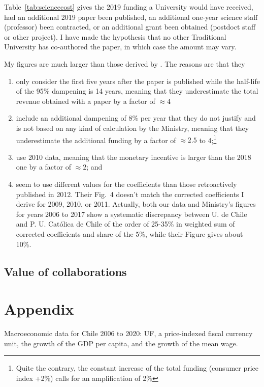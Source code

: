 \documentclass[twocolumn]{article}
\begin{document}
Table~\ref{tab:sciencecost} gives the 2019 funding a University would have received, had an additional 2019 paper been published, an additional one-year science staff (professor) been contracted, or an additional grant been obtained (postdoct staff or other project).  I have made the hypothesis that no other Traditional University has co-authored the paper, in which case the amount may vary. 

My figures are much larger than those derived by \citet{RAM12}.  The reasons are that they
\begin{enumerate}
\item only consider the first five years after the paper is published while the half-life of the 95\% dampening is 14 years, meaning that they underestimate the total revenue obtained with a paper by a factor of $\approx 4$
\item include an additional dampening of 8\% per year that they do not justify and is not based on any kind of calculation by the Ministry, meaning that they underestimate the additional funding by a factor of $\approx 2.5$ to 4;\footnote{Quite the contrary, the constant increase of the total funding (consumer price index +2\%) calls for an amplification of 2\%}
\item use 2010 data, meaning that the monetary incentive is larger than the 2018 one by a factor of $\approx 2$; and
\item seem to use different values for the coefficients than those retroactively published in 2012. Their Fig.~4 doesn't match the corrected coefficients I derive for 2009, 2010, or 2011. Actually, both our data and Ministry's figures for years 2006 to 2017 show a systematic discrepancy between U. de Chile and P. U. Católica de Chile of the order of 25-35\%  in weighted sum of corrected coefficients and share of the 5\%, while their Figure gives about 10\%.
\end{enumerate}

\subsection{Value of collaborations}

\appendix
\section{Appendix}
\begin{table}[t]
\centering
\caption{Macroeconomic data for Chile 2006 to 2020: UF, a price-indexed
fiscal currency unit, the growth of the GDP per capita, and the growth
of the mean wage.}
\label{tab:macro}

\end{table}
\end{document}
